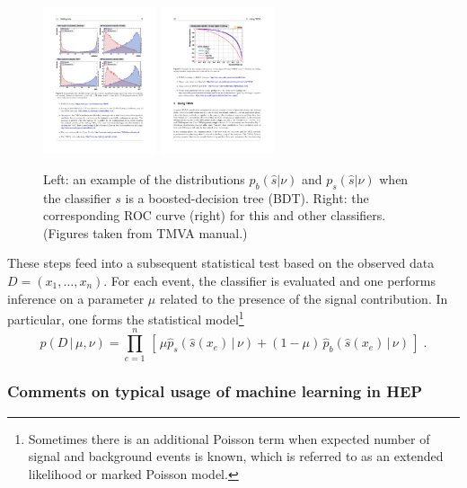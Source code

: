 \documentclass[12pt]{article}
\numberwithin{equation}{section}
\theoremstyle{plain}
\begin{document}
\begin{figure}[t]
\begin{center}
 \includegraphics[height=1.7in]{figures/example-TMVA-BDT.pdf}
 \includegraphics[height=1.7in]{figures/example-TMVA-ROC.pdf}
\caption{Left: an example of the distributions $p_b(\hat s|\nu)$ and $p_s(\hat s|\nu)$ when the classifier $s$ is a boosted-decision tree (BDT). Right: the corresponding ROC curve (right) for this and other classifiers. (Figures taken from TMVA manual.)}
\label{fig:tmva}
\end{center}
\end{figure}

These steps feed into a subsequent statistical test based on the observed data
${D=(x_1, \dots, x_n)}$. For each event, the classifier is evaluated and one
performs inference on a parameter $\mu$ related to the presence of the signal
contribution. In particular, one forms the statistical model\footnote{Sometimes
there is an additional Poisson term when expected number of signal and
background events is known, which is referred to as an extended likelihood or
marked Poisson model.}
\begin{equation}\label{eq:typicalML}
p( D \,|\, \mu, \nu) = \prod_{e=1}^n \, \left[\, \mu \hat{p}_s( \hat s(x_e) \, |\,  \nu)  + (1-\mu)\, \hat{p}_b( \hat s(x_e) \,|\, \nu) \,\right] \; .
\end{equation}

\subsubsection{Comments on typical usage of machine learning in HEP}
\end{document}
